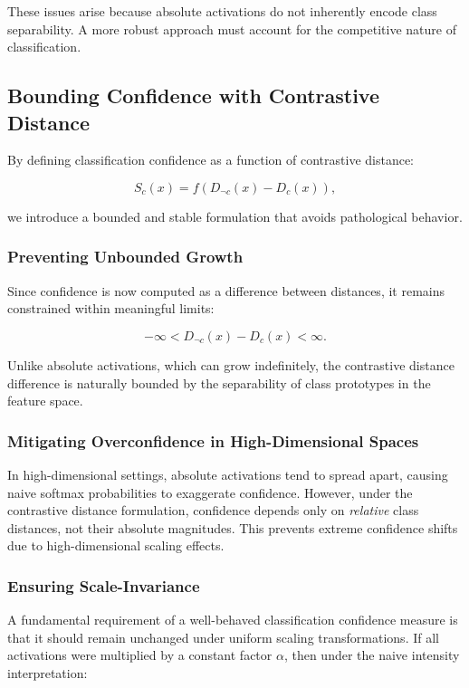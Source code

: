 These issues arise because absolute activations do not inherently encode class separability. A more robust approach must account for the competitive nature of classification.

\subsection{Bounding Confidence with Contrastive Distance}

By defining classification confidence as a function of contrastive distance:

\[
S_c(x) = f(D_{\neg c}(x) - D_c(x)),
\]

we introduce a bounded and stable formulation that avoids pathological behavior.

\subsubsection{Preventing Unbounded Growth}

Since confidence is now computed as a difference between distances, it remains constrained within meaningful limits:

\[
-\infty < D_{\neg c}(x) - D_c(x) < \infty.
\]

Unlike absolute activations, which can grow indefinitely, the contrastive distance difference is naturally bounded by the separability of class prototypes in the feature space.

\subsubsection{Mitigating Overconfidence in High-Dimensional Spaces}

In high-dimensional settings, absolute activations tend to spread apart, causing naive softmax probabilities to exaggerate confidence. However, under the contrastive distance formulation, confidence depends only on \textit{relative} class distances, not their absolute magnitudes. This prevents extreme confidence shifts due to high-dimensional scaling effects.

\subsubsection{Ensuring Scale-Invariance}

A fundamental requirement of a well-behaved classification confidence measure is that it should remain unchanged under uniform scaling transformations. If all activations were multiplied by a constant factor \( \alpha \), then under the naive intensity interpretation:

